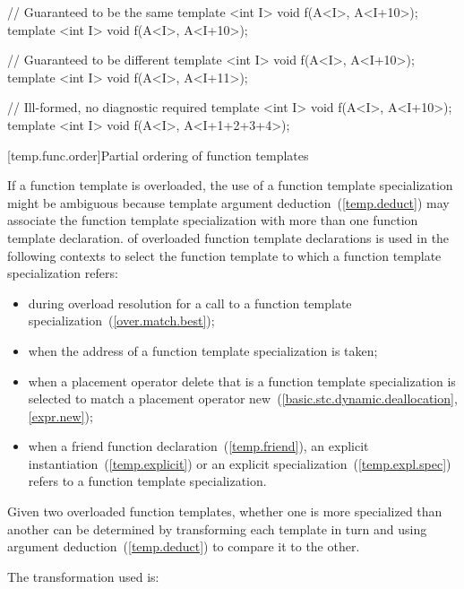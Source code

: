 \begin{codeblock}
// Guaranteed to be the same
template <int I> void f(A<I>, A<I+10>);
template <int I> void f(A<I>, A<I+10>);

// Guaranteed to be different
template <int I> void f(A<I>, A<I+10>);
template <int I> void f(A<I>, A<I+11>);

// Ill-formed, no diagnostic required
template <int I> void f(A<I>, A<I+10>);
template <int I> void f(A<I>, A<I+1+2+3+4>);
\end{codeblock}
\exitnoteb

[temp.func.order]{Partial ordering of function templates}

\pnum
{}%
%
If a function template is overloaded,
the use of a function template specialization might be ambiguous because
template argument deduction~(\ref{temp.deduct}) may associate the function
template specialization with more than one function template declaration.
of overloaded function template declarations is used in the following contexts
to select the function template to which a function template specialization
refers:

\begin{itemize}
\item
during overload resolution for a call to a function template specialization~(\ref{over.match.best});
\item
when the address of a function template specialization is taken;
\item
when a placement operator delete that is a
function template
specialization
is selected to match a placement operator new~(\ref{basic.stc.dynamic.deallocation}, \ref{expr.new});
\item
when a friend function declaration~(\ref{temp.friend}), an
explicit instantiation~(\ref{temp.explicit}) or an explicit specialization~(\ref{temp.expl.spec}) refers to
a function template specialization.
\end{itemize}

\pnum
Given two overloaded function templates, whether one is more specialized
than another can be determined by transforming each template in turn
and using argument deduction~(\ref{temp.deduct}) to compare it to the
other.

\pnum
The transformation used is:

